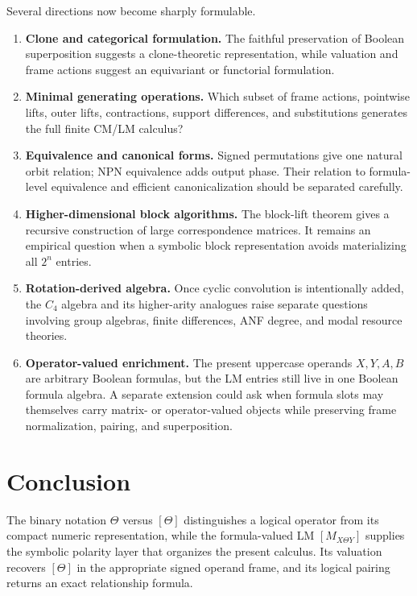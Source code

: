 \documentclass[11pt]{article}
\theoremstyle{definition}
\theoremstyle{remark}
\begin{document}
Several directions now become sharply formulable.
\begin{enumerate}
  \item \textbf{Clone and categorical formulation.}  The faithful preservation of Boolean superposition suggests a clone-theoretic representation, while valuation and frame actions suggest an equivariant or functorial formulation.
  \item \textbf{Minimal generating operations.}  Which subset of frame actions, pointwise lifts, outer lifts, contractions, support differences, and substitutions generates the full finite CM/LM calculus?
  \item \textbf{Equivalence and canonical forms.}  Signed permutations give one natural orbit relation; NPN equivalence adds output phase.  Their relation to formula-level equivalence and efficient canonicalization should be separated carefully.
  \item \textbf{Higher-dimensional block algorithms.}  The block-lift theorem gives a recursive construction of large correspondence matrices.  It remains an empirical question when a symbolic block representation avoids materializing all $2^n$ entries.
  \item \textbf{Rotation-derived algebra.}  Once cyclic convolution is intentionally added, the $C_4$ algebra and its higher-arity analogues raise separate questions involving group algebras, finite differences, ANF degree, and modal resource theories.
  \item \textbf{Operator-valued enrichment.}  The present uppercase operands $X,Y,A,B$ are arbitrary Boolean formulas, but the LM entries still live in one Boolean formula algebra.  A separate extension could ask when formula slots may themselves carry matrix- or operator-valued objects while preserving frame normalization, pairing, and superposition.
\end{enumerate}

\section{Conclusion}

The binary notation $\Theta$ versus $[\Theta]$ distinguishes a logical operator from its compact numeric representation, while the formula-valued LM $[M_{X\Theta Y}]$ supplies the symbolic polarity layer that organizes the present calculus.  Its valuation recovers $[\Theta]$ in the appropriate signed operand frame, and its logical pairing returns an exact relationship formula.
\end{document}
